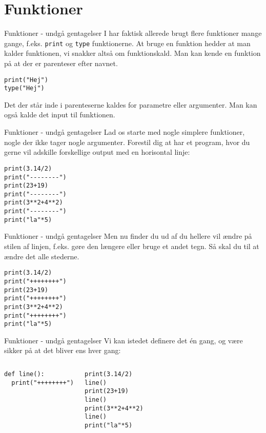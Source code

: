 \documentclass[main.tex]{subfiles}
\begin{document}




\section{Funktioner}

\begin{frame}[fragile]{Funktioner - undgå gentagelser}
	I har faktisk allerede brugt flere funktioner mange gange, f.eks. \texttt{print} og \texttt{type} funktionerne. At bruge en funktion hedder at man kalder funktionen, vi snakker altså om funktionskald. Man kan kende en funktion på at der er parenteser efter navnet.
	
	\begin{lstlisting}[style=python]
print("Hej")
type("Hej")
	\end{lstlisting}
	
	Det der står inde i parenteserne kaldes for parametre eller argumenter. Man kan også kalde det input til funktionen.
\end{frame}

\begin{frame}[fragile]{Funktioner - undgå gentagelser}
	Lad os starte med nogle simplere funktioner, nogle der ikke tager nogle argumenter.
	Forestil dig at har et program, hvor du gerne vil adskille forskellige output med en horisontal linje:
	\begin{lstlisting}[style=python]
print(3.14/2)
print("--------")
print(23+19)
print("--------")
print(3**2+4**2)
print("--------")
print("la"*5)
	\end{lstlisting}
\end{frame}

\begin{frame}[fragile]{Funktioner - undgå gentagelser}
Men nu finder du ud af du hellere vil ændre på stilen af linjen, f.eks. gøre den længere eller bruge et andet tegn. Så skal du til at ændre det alle stederne.
\begin{lstlisting}[style=python]
print(3.14/2)
print("++++++++")
print(23+19)
print("++++++++")
print(3**2+4**2)
print("++++++++")
print("la"*5)
\end{lstlisting}
\end{frame}


\begin{frame}[fragile]{Funktioner - undgå gentagelser}
Vi kan istedet definere det én gang, og være sikker på at det bliver ens hver gang:
\begin{columns}
	\begin{lstlisting}[style=python]
def line():
  print("++++++++")
	\end{lstlisting}
	
	\begin{lstlisting}[style=python]
print(3.14/2)
line()
print(23+19)
line()
print(3**2+4**2)
line()
print("la"*5)
	\end{lstlisting}
\end{columns}
\end{frame}
\end{document}
